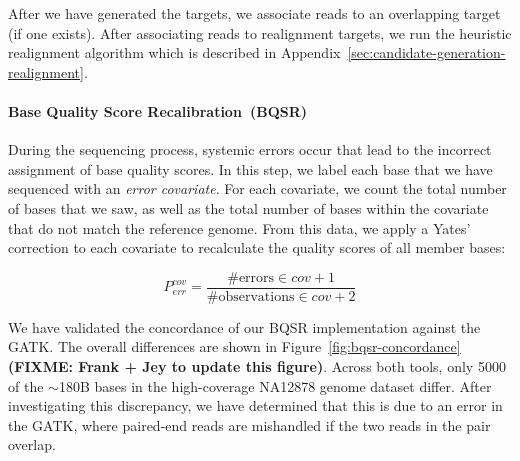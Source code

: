 \documentclass{acm_proc_article-sp}
\begin{document}
After we have generated the targets, we associate reads to an overlapping target (if one exists). After
associating reads to realignment targets, we run the heuristic realignment algorithm which is described
in Appendix~\ref{sec:candidate-generation-realignment}.

\paragraph{Base Quality Score Recalibration~(BQSR)} 
\label{sec:bqsr}
During the sequencing process, systemic errors occur that lead to the incorrect assignment of base
quality scores. In this step, we label each base that we have sequenced with an \emph{error covariate}.
For each covariate, we count the total number of bases that we saw, as well as the total number of
bases within the covariate that do not match the reference genome. From this data, we apply a Yates'
correction to each covariate to recalculate the quality scores of all member bases:

\begin{equation}
\label{eqn:yates}
P_{err}^{cov} = \frac{\text{\# errors} \in cov + 1}{\text{\# observations} \in cov + 2}
\end{equation}

We have validated the concordance of our BQSR implementation against the GATK. The overall
differences are shown in Figure~\ref{fig:bqsr-concordance}\textbf{ (FIXME: Frank + Jey to update this
figure)}.  Across both tools, only 5000 of the $\sim$180B bases in the high-coverage NA12878 genome
dataset differ. After investigating this discrepancy, we have determined that this is due to an error in the
GATK, where paired-end reads are mishandled if the two reads in the pair overlap.
\end{document}

